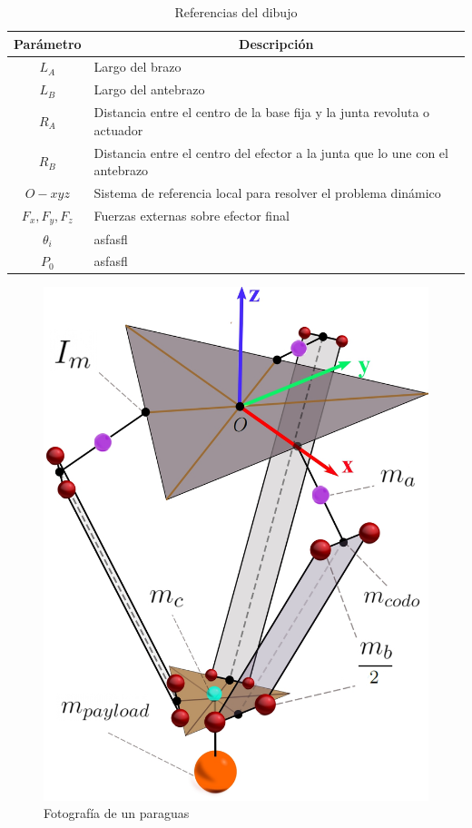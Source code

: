         \begingroup
            \renewcommand{\arraystretch}{1.5}
            \begin{table}[H]
            \centering
            \begin{tabular}{c m{12cm}}
               \hline
               \textbf{Parámetro}  & \multicolumn{1}{c}{\textbf{Descripción}}  \\
               \hline           \hline            
             $L_A$ & Largo del brazo \\
            \hline
             $L_B$ & Largo del antebrazo \\
            \hline
             $R_A$ & Distancia entre el centro de la base fija y la junta revoluta o actuador \\
            \hline
             $R_B$ & Distancia entre el centro del efector a la junta que lo une con el antebrazo\\
            \hline
            ${O} - xyz$ & Sistema de referencia local para resolver el problema dinámico\\
            \hline
             $F_{x},F_{y},F_{z}$ & Fuerzas externas sobre efector final\\
            \hline
            $\theta_i$ & asfasfl\\
            \hline
            $P_0$ & asfasfl\\
            \hline \hline
            \end{tabular}
            \caption{Referencias del dibujo}
           \label{tab:cap4_tabla_13}
        \end{table}
        \endgroup     
\newpage

        \begin{figure}[H]
              \centering
	          \includegraphics[width=0.65\linewidth]{Main/Chapter4/Images4/DIBUJO37.jpg}
              \caption{Fotografía de un paraguas}
              \label{f:Cap4_Metodo_B_Modelacion_Dinamica_2}
        \end{figure}

